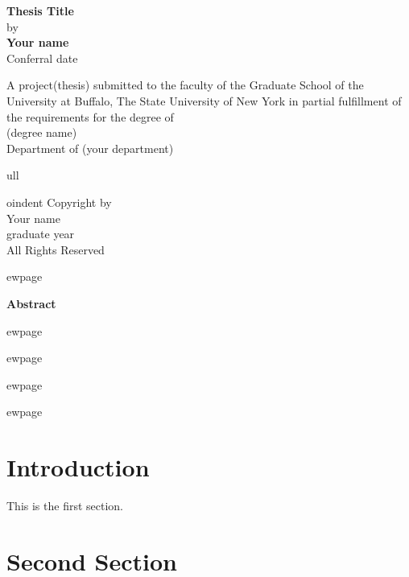 \documentclass[11pt]{article}
\begin{document}
\begin{titlepage}
    \begin{center}
        \vspace*{1cm}
        \Huge
        \textbf{Thesis Title}\\
        \vspace{0.5cm}
        \LARGE
        \vspace{3cm}
        by\\
        \textbf{Your name}\\
        Conferral date 
        \vfill
        \Large
        \begin{singlespace}
         A project(thesis) submitted to the faculty of the Graduate School of the University at Buffalo, The State University of New York in partial fulfillment of the requirements for the degree of\\
         (degree name) \\
         Department of (your department)
         \end{singlespace}

            
    \end{center}
\end{titlepage}

\begin{center}
    
ull\vfill
    
oindent
    Copyright by\\   
    Your name\\
    graduate year \\
    All Rights Reserved
    
ewpage
\end{center}


\begin{center}
\LARGE
\textbf{Abstract}
\end{center}
\blindtext

ewpage


\tableofcontents

ewpage
\listoftables

ewpage
\listoffigures

ewpage


\section*{Introduction}

This is the first section.
\blindtext
\blindtext



\section*{Second Section}
\blindtext
\end{document}
